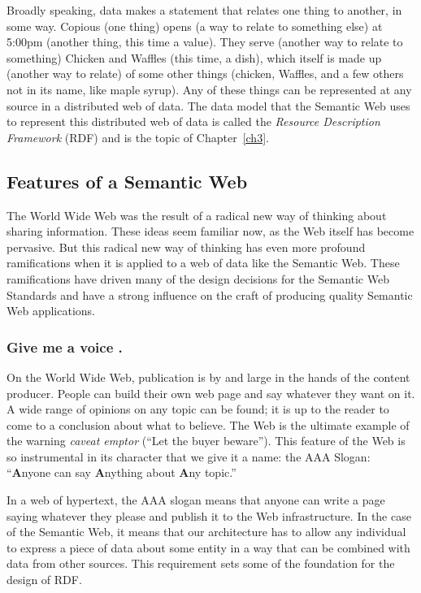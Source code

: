 Broadly speaking, data makes a statement that relates one thing to another, in some 
way.  Copious (one thing) opens (a way to relate to something else) at 5:00pm (another
thing, this time a value).  They serve (another way to relate to something) Chicken 
and Waffles (this time, a dish), which itself is made up (another way to relate) of
some other things (chicken, Waffles, and a few others not in its name, like 
maple syrup).  Any of these things can be represented at any source in a distributed web of data. 
The data model that the Semantic Web
uses to represent this distributed web of data is
called the \emph{Resource Description Framework} (RDF) and is the topic of
Chapter~\ref{ch3}.  



 


\subsection{Features of a Semantic Web}

The World Wide Web was the result of a radical new way of thinking about
sharing information. These ideas seem familiar now, as the Web itself
has become pervasive. But this radical new way of thinking has even more
profound ramifications when it is applied to a web of data like the
Semantic Web. These ramifications have driven many of the design
decisions for the Semantic Web Standards and have a strong influence on
the craft of producing quality Semantic Web applications.




\subsubsection{Give me a voice .}

On the World Wide Web, publication is by and large in the hands of the
content producer. People can build their own web page and say whatever
they want on it. A wide range of opinions on any topic can be found; it
is up to the reader to come to a conclusion about what to believe. The
Web is the ultimate example of the warning \emph{caveat emptor} (``Let
the buyer beware''). This feature of the Web is so instrumental in its
character that we give it a name: the AAA Slogan: ``\textbf{A}nyone can
say \textbf{A}nything about \textbf{A}ny topic.''

In a web of hypertext, the AAA slogan means that anyone can write a page
saying whatever they please and publish it to the Web infrastructure. In
the case of the Semantic Web, it means that our
architecture has to allow any individual to express a piece of data
about some entity in a way that can be combined with data from other
sources. This requirement sets some of the foundation for the design of
RDF.

